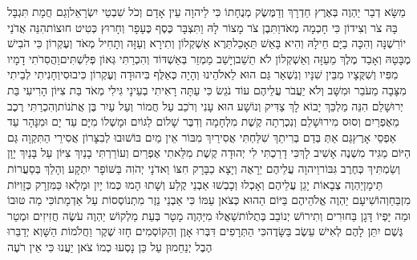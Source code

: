 \documentclass[../main/main.tex]{subfiles}
\begin{document}
\begin{multicols*}{\ncols}
מַשָּׂא דְבַר יַהְוֶה בְּאֶרֶץ חַדְרָךְ וְדַמֶּשֶׂק מְנֻחָתוֹ כִּי לַיהוָה עֵין אָדָם וְכֹל שִׁבְטֵי יִשְׂרָאֵל\PreVerseSpace{}וְגַם חֲמָת תִּגְבָּל בָּהּ צֹר וְצִידוֹן כִּי חָכְמָה מְאֹד\PreVerseSpace{}וַתִּבֶן צֹר מָצוֹר לָהּ וַתִּצְבָּר כֶּסֶף כֶּעָפָר וְחָרוּץ כְּטִיט חוּצוֹת\PreVerseSpace{}הִנֵּה אֲדֹנַי יוֹרִשֶׁנָּה וְהִכָּה בַיָּם חֵילָהּ וְהִיא בָּאֵשׁ תֵּאָכֵל\PreVerseSpace{}תֵּרֶא אַשְׁקְלוֹן וְתִירָא וְעַזָּה וְתָחִיל מְאֹד וְעֶקְרוֹן כִּי הֹבִישׁ מֶבָּטָהּ וְאָבַד מֶלֶךְ מֵעַזָּה וְאַשְׁקְלוֹן לֹא תֵשֵׁב\PreVerseSpace{}וְיָשַׁב מַמְזֵר בְּאַשְׁדּוֹד וְהִכְרַתִּי גְּאוֹן פְּלִשְׁתִּים\PreVerseSpace{}וַהֲסִרֹתִי דָמָיו מִפִּיו וְשִׁקֻּצָיו מִבֵּין שִׁנָּיו וְנִשְׁאַר גַּם הוּא לֵאלֹהֵינוּ וְהָיָה כְּאַלֻּף בִּיהוּדָה וְעֶקְרוֹן כִּיבוּסִי\PreVerseSpace{}וְחָנִיתִי לְבֵיתִי מִצָּבָה מֵעֹבֵר וּמִשָּׁב וְלֹא יַעֲבֹר עֲלֵיהֶם עוֹד נֹגֵשׂ כִּי עַתָּה רָאִיתִי בְעֵינָי \ClosedSection{}גִּילִי מְאֹד בַּת צִיּוֹן הָרִיעִי בַּת יְרוּשָׁלֵם הִנֵּה מַלְכֵּךְ יָבוֹא לָךְ צַדִּיק וְנוֹשָׁע הוּא עָנִי וְרֹכֵב עַל חֲמוֹר וְעַל עַיִר בֶּן אֲתֹנוֹת\PreVerseSpace{}וְהִכְרַתִּי רֶכֶב מֵאֶפְרַיִם וְסוּס מִירוּשָׁלֵם וְנִכְרְתָה קֶשֶׁת מִלְחָמָה וְדִבֶּר שָׁלוֹם לַגּוֹיִם וּמָשְׁלוֹ מִיָּם עַד יָם וּמִנָּהָר עַד אַפְסֵי אָרֶץ\PreVerseSpace{}גַּם אַתְּ בְּדַם בְּרִיתֵךְ שִׁלַּחְתִּי אֲסִירַיִךְ מִבּוֹר אֵין מַיִם בּוֹ\PreVerseSpace{}שׁוּבוּ לְבִצָּרוֹן אֲסִירֵי הַתִּקְוָה גַּם הַיּוֹם מַגִּיד מִשְׁנֶה אָשִׁיב לָךְ\PreVerseSpace{}כִּי דָרַכְתִּי לִי יְהוּדָה קֶשֶׁת מִלֵּאתִי אֶפְרַיִם וְעוֹרַרְתִּי בָנַיִךְ צִיּוֹן עַל בָּנַיִךְ יָוָן וְשַׂמְתִּיךְ כְּחֶרֶב גִּבּוֹר\PreVerseSpace{}וַיהוָה עֲלֵיהֶם יֵרָאֶה וְיָצָא כַבָּרָק חִצּוֹ וַאדֹנָי יְהֹוִה בַּשּׁוֹפָר יִתְקָע וְהָלַךְ בְּסַעֲרוֹת תֵּימָן\PreVerseSpace{}יַהְוֶה צְבָאוֹת יָגֵן עֲלֵיהֶם וְאָכְלוּ וְכָבְשׁוּ אַבְנֵי קֶלַע וְשָׁתוּ הָמוּ כְּמוֹ יָיִן וּמָלְאוּ כַּמִּזְרָק כְּזָוִיּוֹת מִזְבֵּחַ\PreVerseSpace{}וְהוֹשִׁיעָם יַהְוֶה אֱלֹהֵיהֶם בַּיּוֹם הַהוּא כְּצֹאן עַמּוֹ כִּי אַבְנֵי נֵזֶר מִתְנוֹסְסוֹת עַל אַדְמָתוֹ\PreVerseSpace{}כִּי מַה טּוּבוֹ וּמַה יָּפְיוֹ דָּגָן בַּחוּרִים וְתִירוֹשׁ יְנוֹבֵב בְּתֻלוֹת\PreChapterSpace{}שַׁאֲלוּ מִיַּהְוֶה מָטָר בְּעֵת מַלְקוֹשׁ יַהְוֶה עֹשֶׂה חֲזִיזִים וּמְטַר גֶּשֶׁם יִתֵּן לָהֶם לְאִישׁ עֵשֶׂב בַּשָּׂדֶה\PreVerseSpace{}כִּי הַתְּרָפִים דִּבְּרוּ אָוֶן וְהַקּוֹסְמִים חָזוּ שֶׁקֶר וַחֲלֹמוֹת הַשָּׁוְא יְדַבֵּרוּ הֶבֶל יְנַחֵמוּן עַל כֵּן נָסְעוּ כְמוֹ צֹאן יַעֲנוּ כִּי אֵין רֹעֶה\OpenSection{}\par

\end{multicols*}
\end{document}
